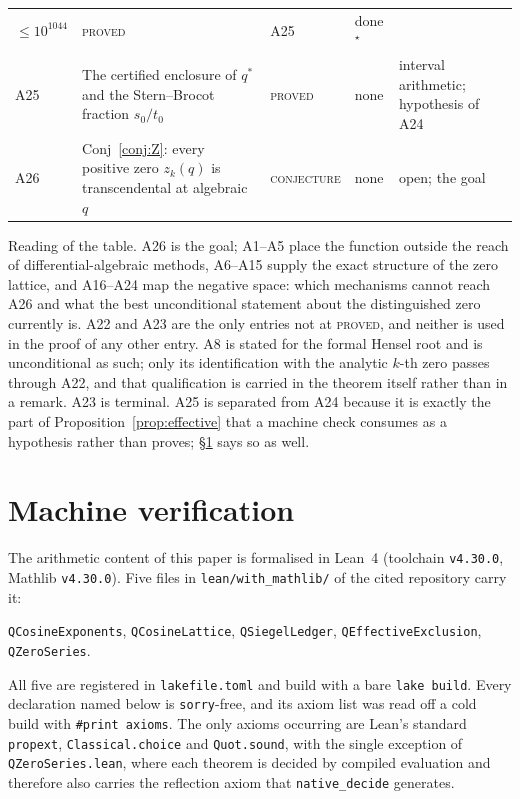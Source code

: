 \documentclass[11pt]{article}
\theoremstyle{plain}
\theoremstyle{definition}
\theoremstyle{remark}
\begin{document}
\begin{center}
\begin{tabular}{@{}l>{\raggedright\arraybackslash}p{5.4cm}>{\raggedright\arraybackslash}p{2.4cm}>{\raggedright\arraybackslash}p{1.7cm}>{\raggedright\arraybackslash}p{2.2cm}@{}}
  $\le10^{1044}$ & \textsc{proved} & A25 & done$^\star$\\
A25 & The certified enclosure of $q^\ast$ and the Stern--Brocot fraction $s_0/t_0$ &
  \textsc{proved} & none & interval arithmetic; hypothesis of A24\\
A26 & Conj~\ref{conj:Z}: every positive zero $z_k(q)$ is transcendental at algebraic $q$ &
  \textsc{conjecture} & none & open; the goal\\
\hline
\end{tabular}
\end{center}

\noindent Reading of the table. A26 is the goal; A1--A5 place the function outside the reach of
differential-algebraic methods, A6--A15 supply the exact structure of the zero lattice, and
A16--A24 map the negative space: which mechanisms cannot reach A26 and what the best
unconditional statement about the distinguished zero currently is. A22 and A23 are the only
entries not at \textsc{proved}, and neither is used in the proof of any other entry. A8 is
stated for the formal Hensel root and is unconditional as such; only its identification with the
analytic $k$-th zero passes through A22, and that qualification is carried in the theorem itself
rather than in a remark. A23 is terminal. A25 is separated from A24 because it is exactly the part of
Proposition~\ref{prop:effective} that a machine check consumes as a hypothesis rather than proves;
\S\ref{sec:lean} says so as well.

\section{Machine verification}\label{sec:lean}

The arithmetic content of this paper is formalised in Lean~4 (toolchain \texttt{v4.30.0}, Mathlib
\texttt{v4.30.0}). Five files in \texttt{lean/with\_mathlib/} of the cited repository carry it:
\begin{center}
\texttt{QCosineExponents}, \texttt{QCosineLattice}, \texttt{QSiegelLedger},
\texttt{QEffectiveExclusion}, \texttt{QZeroSeries}.
\end{center}
\noindent All five are registered in
\texttt{lakefile.toml} and build with a bare \texttt{lake build}. Every declaration named below is
\texttt{sorry}-free, and its axiom list was read off a cold build with \texttt{\#print axioms}. The
only axioms occurring are Lean's standard \texttt{propext}, \texttt{Classical.choice} and
\texttt{Quot.sound}, with the single exception of \texttt{QZeroSeries.lean}, where each theorem is
decided by compiled evaluation and therefore also carries the reflection axiom that
\texttt{native\_decide} generates.
\end{document}
